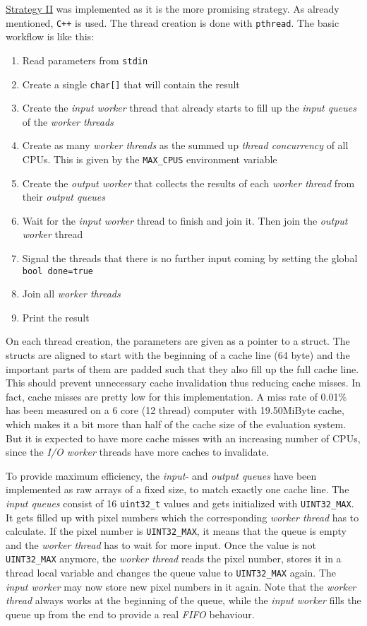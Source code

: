 \hyperref[ssec:strategy-ii]{Strategy II} was implemented as it is the more promising strategy. As already mentioned, \verb$C++$ is used. The thread creation is done with \verb$pthread$. The basic workflow is like this:

\begin{enumerate}
    \item Read parameters from \verb$stdin$
    \item Create a single \verb$char[]$ that will contain the result
    \item Create the \textit{input worker} thread that already starts to fill up the \textit{input queues} of the \textit{worker threads}
    \item Create as many \textit{worker threads} as the summed up \textit{thread concurrency} of all CPUs. This is given by the \verb$MAX_CPUS$ environment variable
    \item Create the \textit{output worker} that collects the results of each \textit{worker thread} from their \textit{output queues}
    \item Wait for the \textit{input worker} thread to finish and join it. Then join the \textit{output worker} thread
    \item Signal the threads that there is no further input coming by setting the global \verb$bool done=true$
    \item Join all \textit{worker threads}
    \item Print the result
\end{enumerate}

On each thread creation, the parameters are given as a pointer to a struct. The structs are aligned to start with the beginning of a cache line (64 byte) and the important parts of them are padded such that they also fill up the full cache line. This should prevent unnecessary cache invalidation thus reducing cache misses. In fact, cache misses are pretty low for this implementation. A miss rate of 0.01\% has been measured on a 6 core (12 thread) computer with 19.50MiByte cache, which makes it a bit more than half of the cache size of the evaluation system. But it is expected to have more cache misses with an increasing number of CPUs, since the \textit{I/O worker} threads have more caches to invalidate.

To provide maximum efficiency, the \textit{input-} and \textit{output queues} have been implemented as raw arrays of a fixed size, to match exactly one cache line. The \textit{input queues} consist of 16 \verb$uint32_t$ values and gets initialized with \verb$UINT32_MAX$. It gets filled up with pixel numbers which the corresponding \textit{worker thread} has to calculate. If the pixel number is \verb$UINT32_MAX$, it means that the queue is empty and the \textit{worker thread} has to wait for more input. Once the value is not \verb$UINT32_MAX$ anymore, the \textit{worker thread} reads the pixel number, stores it in a thread local variable and changes the queue value to \verb$UINT32_MAX$ again. The \textit{input worker} may now store new pixel numbers in it again. Note that the \textit{worker thread} always works at the beginning of the queue, while the \textit{input worker} fills the queue up from the end to provide a real \textit{FIFO} behaviour.

